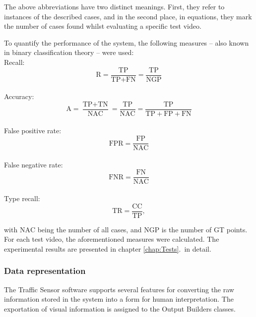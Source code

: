 The above abbreviations have two distinct meanings. 
First, they refer to instances of the described cases, and in the second place, in equations, they mark the number of cases found whilst evaluating a specific test video.

To quantify the performance of the system, the following measures -- also known in binary classification theory -- were used:
\\[5pt]
\noindent Recall:
\begin{displaymath}
\text{R} = \frac{\text{TP}}{\text{TP}+\text{FN}} = \frac{\text{TP}}{\text{NGP}}
\end{displaymath}
\\[5pt]
\noindent Accuracy:
\begin{displaymath}
\text{A} = \frac{\text{TP}+\text{TN}}{\text{NAC}} = \frac{\text{TP}}{\text{NAC}} = \frac{\text{TP}}{\text{TP}+\text{FP}+\text{FN}}
\end{displaymath}
\\[5pt]
\noindent False positive rate:
\begin{displaymath}
\text{FPR} = \frac{\text{FP}}{\text{NAC}}
\end{displaymath}
\\[5pt]
\noindent False negative rate:
\begin{displaymath}
\text{FNR} = \frac{\text{FN}}{\text{NAC}}
\end{displaymath}
\\[5pt]
\noindent Type recall:
\begin{displaymath}
\text{TR} = \frac{\text{CC}}{\text{TP}},
\end{displaymath}

with $\text{NAC}$ being the number of all cases, and $\text{NGP}$ is the number of GT points.
For each test video, the aforementioned measures were calculated.
The experimental results are presented in chapter \ref{chap:Tests}.~in detail.
\subsubsection{Data representation}\label{sec:data_representation}
The Traffic Sensor software supports several features for converting the raw information stored in the system into a form for human interpretation.
The exportation of visual information is assigned to the Output Builders classes.

